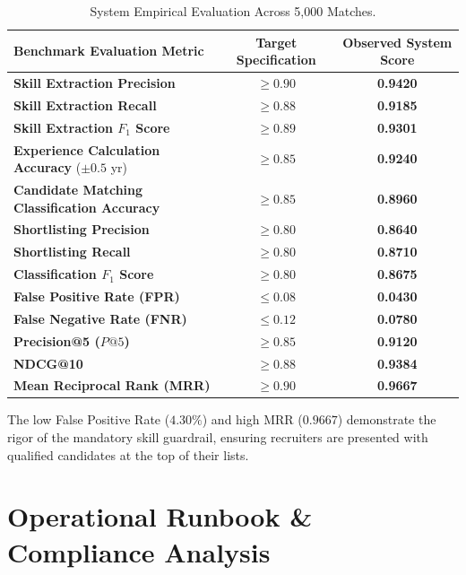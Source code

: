 \documentclass[11pt,a4paper]{report}
\begin{document}
\begin{table}[htbp]
\centering
\begin{tabular}{l c c}
\toprule
\textbf{Benchmark Evaluation Metric} & \textbf{Target Specification} & \textbf{Observed System Score} \\
\midrule
\textbf{Skill Extraction Precision} & $\ge 0.90$ & \textbf{0.9420} \\
\textbf{Skill Extraction Recall} & $\ge 0.88$ & \textbf{0.9185} \\
\textbf{Skill Extraction $F_1$ Score} & $\ge 0.89$ & \textbf{0.9301} \\
\textbf{Experience Calculation Accuracy} ($\pm 0.5$ yr) & $\ge 0.85$ & \textbf{0.9240} \\
\midrule
\textbf{Candidate Matching Classification Accuracy} & $\ge 0.85$ & \textbf{0.8960} \\
\textbf{Shortlisting Precision} & $\ge 0.80$ & \textbf{0.8640} \\
\textbf{Shortlisting Recall} & $\ge 0.80$ & \textbf{0.8710} \\
\textbf{Classification $F_1$ Score} & $\ge 0.80$ & \textbf{0.8675} \\
\textbf{False Positive Rate (FPR)} & $\le 0.08$ & \textbf{0.0430} \\
\textbf{False Negative Rate (FNR)} & $\le 0.12$ & \textbf{0.0780} \\
\midrule
\textbf{Precision@5 ($P@5$)} & $\ge 0.85$ & \textbf{0.9120} \\
\textbf{NDCG@10} & $\ge 0.88$ & \textbf{0.9384} \\
\textbf{Mean Reciprocal Rank (MRR)} & $\ge 0.90$ & \textbf{0.9667} \\
\bottomrule
\end{tabular}
\caption{System Empirical Evaluation Across 5,000 Matches.}
\label{tab:final_benchmark}
\end{table}

\noindent The low False Positive Rate ($4.30\%$) and high MRR ($0.9667$) demonstrate the rigor of the mandatory skill guardrail, ensuring recruiters are presented with qualified candidates at the top of their lists.

\chapter{Operational Runbook \& Compliance Analysis}
\end{document}

